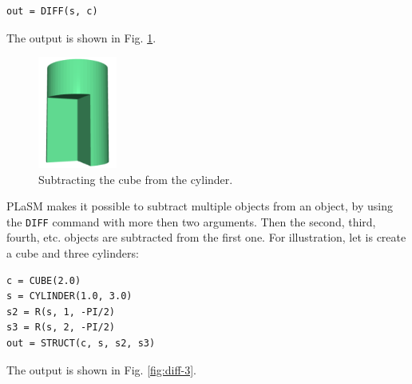\begin{bbox}
\begin{verbatim}
out = DIFF(s, c) 
\end{verbatim}
\end{bbox}
\vspace{6mm}

\noindent
The output is shown in Fig. \ref{fig:diff-2}.


\begin{figure}[!ht]
\begin{center}
\includegraphics[width=0.23\textwidth]{img/diff-2.png}
\end{center}
\vspace{-4mm}
\caption{Subtracting the cube from the cylinder.}
\label{fig:diff-2}
\end{figure}
\newpage
\noindent
PLaSM makes it possible to subtract multiple objects from an 
object, by using  the {\tt DIFF} command with more then two arguments.
Then the second, third, fourth, etc. objects are subtracted
from the first one. For illustration, let is create a cube and
three cylinders:\\

\begin{bbox}
\begin{verbatim}
c = CUBE(2.0)
s = CYLINDER(1.0, 3.0)
s2 = R(s, 1, -PI/2)
s3 = R(s, 2, -PI/2)
out = STRUCT(c, s, s2, s3) 
\end{verbatim}
\end{bbox}
\vspace{6mm}

\noindent
The output is shown in Fig. \ref{fig:diff-3}.

